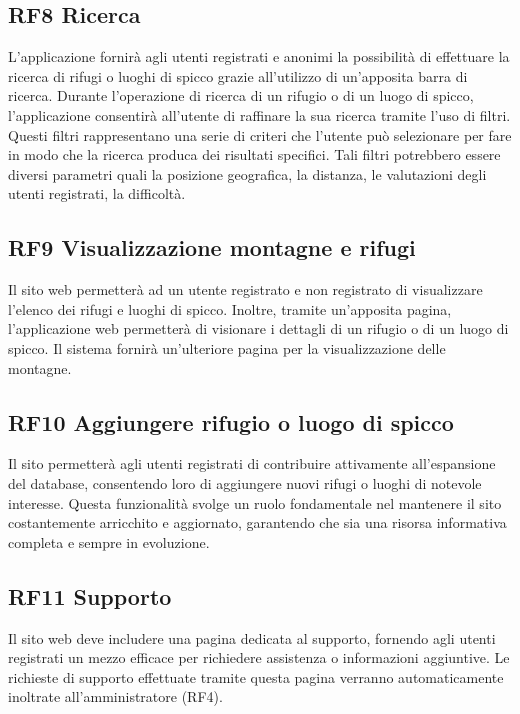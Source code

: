 \documentclass[a4paper,12pt]{article}
\begin{document}
\subsection*{RF8 Ricerca}
L'applicazione fornirà agli utenti registrati e anonimi la possibilità di effettuare la ricerca di rifugi o luoghi di spicco grazie all’utilizzo di un’apposita barra di ricerca.\newline
Durante l'operazione di ricerca di un rifugio o di un luogo di spicco, l'applicazione consentirà all'utente di raffinare la sua ricerca tramite l'uso di filtri.\newline
Questi filtri rappresentano una serie di criteri che l'utente può selezionare per fare in modo che la ricerca produca dei risultati specifici.
Tali filtri potrebbero essere diversi parametri quali la posizione geografica, la distanza, le valutazioni degli utenti registrati, la difficoltà.


\subsection*{RF9 Visualizzazione montagne e rifugi}
Il sito web permetterà ad un utente registrato e non registrato di visualizzare l'elenco dei rifugi e luoghi di spicco.\newline
Inoltre, tramite un'apposita pagina, l'applicazione web permetterà di visionare i dettagli di un rifugio o di un luogo di spicco.\newline
Il sistema fornirà un'ulteriore pagina per la visualizzazione delle montagne.


\subsection*{RF10 Aggiungere rifugio o luogo di spicco}
Il sito permetterà agli utenti registrati di contribuire attivamente all'espansione del database, consentendo loro di aggiungere nuovi rifugi o luoghi di notevole interesse. Questa funzionalità svolge un ruolo fondamentale nel mantenere il sito costantemente arricchito e aggiornato, garantendo che sia una risorsa informativa completa e sempre in evoluzione.

\subsection*{RF11 Supporto}
Il sito web deve includere una pagina dedicata al supporto, fornendo agli utenti registrati un mezzo efficace per richiedere assistenza o informazioni aggiuntive. Le richieste di supporto effettuate tramite questa pagina verranno automaticamente inoltrate all'amministratore (RF4).
\end{document}
